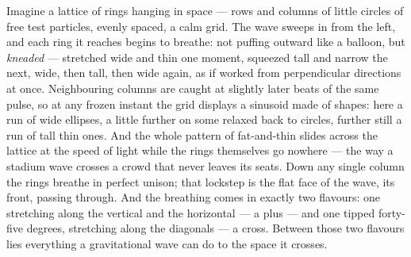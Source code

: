 \documentclass[fontsize=11pt,paper=a4,pagesize=auto,parskip=half-]{scrbook}
\begin{document}
Imagine a lattice of rings hanging in space --- rows and columns of little circles of free test particles, evenly spaced, a calm grid. The wave sweeps in from the left, and each ring it reaches begins to breathe: not puffing outward like a balloon, but \emph{kneaded} --- stretched wide and thin one moment, squeezed tall and narrow the next, wide, then tall, then wide again, as if worked from perpendicular directions at once. Neighbouring columns are caught at slightly later beats of the same pulse, so at any frozen instant the grid displays a sinusoid made of shapes: here a run of wide ellipses, a little further on some relaxed back to circles, further still a run of tall thin ones. And the whole pattern of fat-and-thin slides across the lattice at the speed of light while the rings themselves go nowhere --- the way a stadium wave crosses a crowd that never leaves its seats. Down any single column the rings breathe in perfect unison; that lockstep is the flat face of the wave, its front, passing through. And the breathing comes in exactly two flavours: one stretching along the vertical and the horizontal --- a plus --- and one tipped forty-five degrees, stretching along the diagonals --- a cross. Between those two flavours lies everything a gravitational wave can do to the space it crosses.
\end{document}
